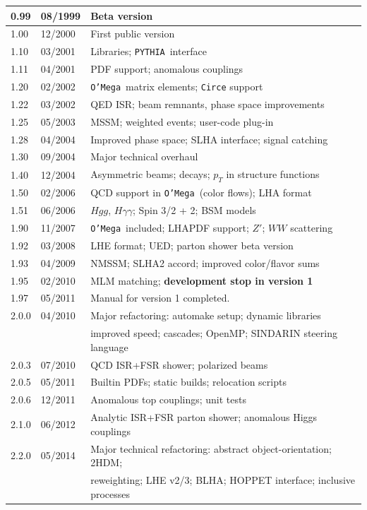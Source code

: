 \documentclass[12pt]{book}
\newcommand{\ttt}[1]{\texttt{#1}}
\newcommand{\oMega}{\texttt{O'Mega}}
\newcommand{\pythia}{\texttt{PYTHIA}}
\begin{document}
\begin{center}
\begin{tabular}{|l|l|l|}\hline
  0.99 & 08/1999 & Beta version \\\hline
  1.00 & 12/2000 & First public version \\\hline
  1.10 & 03/2001 & Libraries; \pythia\ interface \\ 
  1.11 & 04/2001 & PDF support; anomalous couplings \\ \hline
  1.20 & 02/2002 & \oMega\ matrix elements; \ttt{Circe} support\\
  1.22 & 03/2002 & QED ISR; beam remnants, phase space improvements \\
  1.25 & 05/2003 & MSSM; weighted events; user-code plug-in \\
  1.28 & 04/2004 & Improved phase space; SLHA interface; signal catching
  \\\hline
  1.30 & 09/2004 & Major technical overhaul \\\hline
  1.40 & 12/2004 & Asymmetric beams; decays; $p_T$ in structure 
  functions \\\hline
  1.50 & 02/2006 & QCD support in \oMega\ (color flows); LHA format \\
  1.51 & 06/2006 & $Hgg$, $H\gamma\gamma$; Spin 3/2 + 2; BSM models
  \\\hline
  1.90 & 11/2007 & \oMega\ included; LHAPDF support; $Z'$; $WW$ scattering \\ 
  1.92 & 03/2008 & LHE format; UED; parton shower beta version \\ 
  1.93 & 04/2009 & NMSSM; SLHA2 accord; improved color/flavor sums \\
  1.95 & 02/2010 & MLM matching; {\bf development stop in version 1}
  \\
  1.97 & 05/2011 & Manual for version 1 completed. \\\hline\hline
  2.0.0 & 04/2010 & Major refactoring: automake setup; dynamic
  libraries \\ 
  & & improved speed; cascades; OpenMP; SINDARIN steering language \\
  2.0.3 & 07/2010 & QCD ISR+FSR shower; polarized beams \\ 
  2.0.5 & 05/2011 & Builtin PDFs; static builds; relocation scripts \\
  2.0.6 & 12/2011 & Anomalous top couplings; unit tests \\\hline
  2.1.0 & 06/2012 & Analytic ISR+FSR parton shower; anomalous Higgs
  couplings \\\hline
  2.2.0 & 05/2014 & Major technical refactoring: abstract
  object-orientation; 2HDM; \\
  & & reweighting; LHE v2/3; BLHA; HOPPET interface; inclusive
  processes \\\hline 
\end{tabular}
\end{center}
\end{document}
